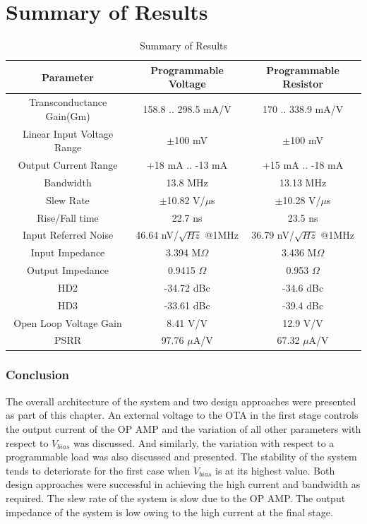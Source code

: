 \section{Summary of Results}
\begin{table} [H]
\centering
\begin{tabular}{@{}ccc@{}}
\toprule
Parameter						& Programmable Voltage			& Programmable Resistor	\\ \midrule
Transconductance Gain(Gm)		& 158.8 .. 298.5 mA/V			& 170 .. 338.9 mA/V		\\
Linear Input Voltage Range		& $\pm$100 mV					& $\pm$100 mV			\\
Output Current Range			& +18 mA .. -13 mA				& +15 mA .. -18 mA		\\
Bandwidth						& 13.8 MHz						& 13.13 MHz				\\
Slew Rate						& $\pm$10.82 V/$\mu$s			& $\pm$10.28 V/$\mu$s	\\
Rise/Fall time					& 22.7 ns						& 23.5 ns				\\
Input Referred Noise			& 46.64 nV/$\sqrt{Hz}$ @1MHz	& 36.79 nV/$\sqrt{Hz}$ @1MHz\\
Input Impedance					& 3.394 M$\Omega$				& 3.436 M$\Omega$		\\
Output Impedance				& 0.9415 $\Omega$				& 0.953 $\Omega$		\\
HD2								& -34.72 dBc					& -34.6 dBc				\\
HD3								& -33.61 dBc					& -39.4 dBc				\\
Open Loop Voltage Gain			& 8.41 V/V						& 12.9 V/V				\\
PSRR							& 97.76 $\mu$A/V				& 67.32 $\mu$A/V		\\
\bottomrule
\end{tabular}
\caption{Summary of Results}
\label{tab:Results}
\end{table}

\subsubsection{Conclusion}
The overall architecture of the system and two design approaches were presented as part of this chapter. An external voltage to the OTA in the first stage controls the output current of the OP AMP and the variation of all other parameters with respect to $V_{bias}$ was discussed. And similarly, the variation with respect to a programmable load was also discussed and presented. The stability of the system tends to deteriorate for the first case when $V_{bias}$ is at its highest value. Both design approaches were successful in achieving the high current and bandwidth as required. The slew rate of the system is slow due to the OP AMP. The output impedance of the system is low owing to the high current at the final stage.